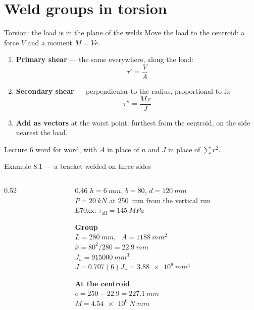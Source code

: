 \documentclass[aspectratio=169,10pt]{beamer}
\begin{document}
\section{Weld groups in torsion}

\begin{frame}{Torsion: the load is in the plane of the welds}
Move the load to the centroid: a force $V$ and a moment $M=Ve$.

\begin{enumerate}
\item \textbf{Primary shear} --- the same everywhere, along the load:
  \[ \tau'=\frac{V}{A} \]
\item \textbf{Secondary shear} --- perpendicular to the radius, proportional to it:
  \[ \tau''=\frac{M\,r}{J} \]
\item \textbf{Add as vectors} at the worst point: furthest from the centroid, on the side nearest the load.
\end{enumerate}
\vfill
Lecture 6 word for word, with $A$ in place of $n$ and $J$ in place of $\sum r^2$.
\end{frame}

\begin{frame}{Example 8.1 --- a bracket welded on three sides}
\begin{columns}[c]
\begin{column}{0.52\textwidth}
\resizebox{\textwidth}{!}{}
\end{column}
\begin{column}{0.46\textwidth}
\small
$h=\SI{6}{mm}$, $b=80$, $d=\SI{120}{mm}$\\
$P=\SI{20}{kN}$ at \SI{250}{mm} from the vertical run\\
E70xx: $\tau_{\text{all}}=\SI{145}{MPa}$

\medskip
\textbf{Group}\\
$L=\SI{280}{mm}$, \ $A=\SI{1188}{mm^2}$\\
$\bar x=80^2/280=\SI{22.9}{mm}$\\
$J_u=\SI{915000}{mm^3}$\\
$J=0.707(6)J_u=\SI{3.88e6}{mm^4}$

\medskip
\textbf{At the centroid}\\
$e=250-22.9=\SI{227.1}{mm}$\\
$M=\SI{4.54e6}{N.mm}$
\end{column}
\end{columns}
\end{frame}
\end{document}
